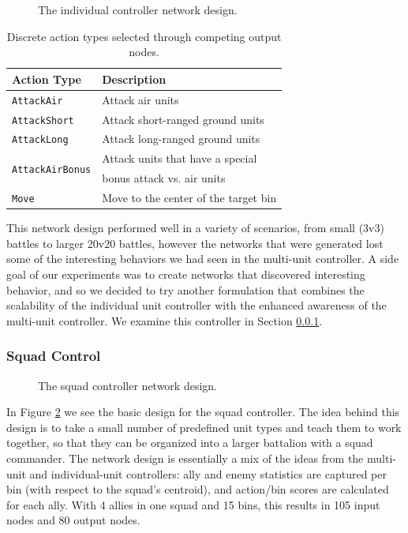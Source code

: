 \documentclass[a4paper]{article}
\begin{document}
\begin{figure}

\caption{The individual controller network design.}
\label{fig:design_individual}
\end{figure}

\begin{table}
\centering
\begin{tabular}{|l|l|}
	\hline
	{\bf Action Type} & {\bf Description}\\ \hline
	\texttt{AttackAir} & Attack air units\\ \hline
	\texttt{AttackShort} & Attack short-ranged ground units\\ \hline
	\texttt{AttackLong} & Attack long-ranged ground units\\ \hline
	\multirow{2}{*}{\texttt{AttackAirBonus}} & Attack units that have a special \\
	& bonus attack vs. air units\\ \hline
	\texttt{Move} & Move to the center of the target bin\\ \hline
\end{tabular}
\caption{Discrete action types selected through competing output nodes.}
\label{tab:actions}
\end{table}

This network design performed well in a variety of scenarios, from small (3v3) battles to larger 20v20 battles, however the networks that were generated lost some of the interesting behaviors we had seen in the multi-unit controller. A side goal of our experiments was to create networks that discovered interesting behavior, and so we decided to try another formulation that combines the scalability of the individual unit controller with the enhanced awareness of the multi-unit controller. We examine this controller in Section \ref{sec:squad_design}.

\subsubsection{Squad Control}
\label{sec:squad_design}

\begin{figure}

\caption{The squad controller network design.}
\label{fig:squad_design}
\end{figure}

In Figure \ref{fig:squad_design} we see the basic design for the squad controller. The idea behind this design is to take a small number of predefined unit types and teach them to work together, so that they can be organized into a larger battalion with a squad commander. The network design is essentially a mix of the ideas from the multi-unit and individual-unit controllers: ally and enemy statistics are captured per bin (with respect to the squad's centroid), and action/bin scores are calculated for each ally. With 4 allies in one squad and 15 bins, this results in 105 input nodes and 80 output nodes.
\end{document}
